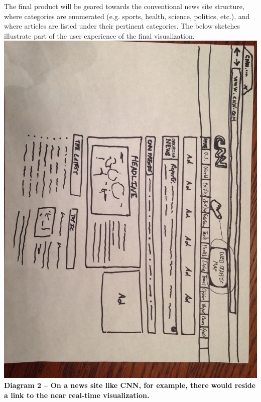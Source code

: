 \documentclass[12pt]{article}
\begin{document}
The final product will be geared towards the conventional news site structure, where categories are enumerated (e.g. sports, health, science, politics, etc.), and where articles are listed under their pertinent categories. The below sketches illustrate part of the user experience of the final visualization.\\

\noindent\includegraphics[scale=0.2]{img/cnn_example}
\noindent\textbf{Diagram 2 -- On a news site like CNN, for example, there would reside a link to the near real-time visualization.}
\end{document}
